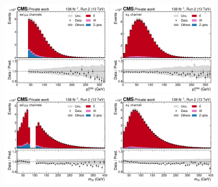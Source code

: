 \begin{figure}[!hp]
    \centering
    \includegraphics[width=0.49\textwidth]{figures/ah/controlplots/ReqMET/METpt__sf.pdf}
    \hfill
    \includegraphics[width=0.49\textwidth]{figures/ah/controlplots/ReqMET/METpt__em.pdf}
    \includegraphics[width=0.49\textwidth]{figures/ah/controlplots/ReqMET/mll__sf.pdf}
    \hfill
    \includegraphics[width=0.49\textwidth]{figures/ah/controlplots/ReqMET/mll__em.pdf}

\end{figure}
